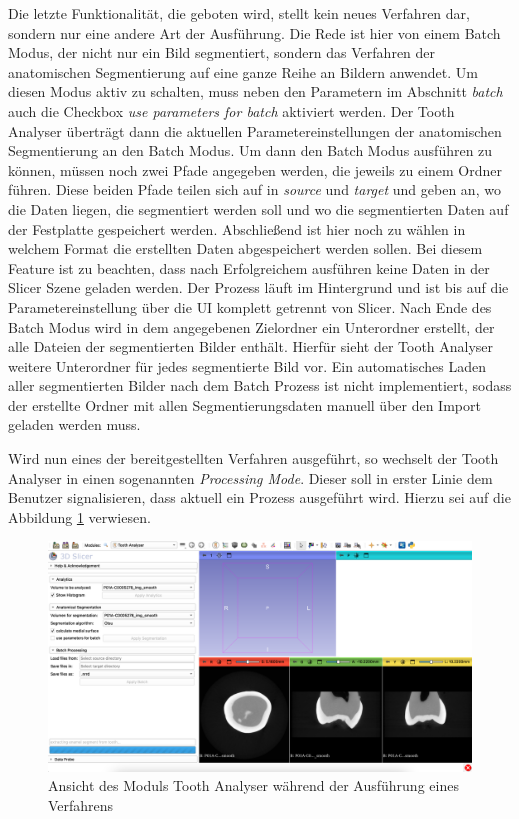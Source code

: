 Die letzte Funktionalität, die geboten wird, stellt kein neues Verfahren dar,
sondern nur eine andere Art der Ausführung. Die Rede ist hier von einem Batch Modus,
der nicht nur ein Bild segmentiert, sondern das Verfahren der anatomischen Segmentierung
auf eine ganze Reihe an Bildern anwendet. Um diesen Modus aktiv zu schalten, muss
neben den Parametern im Abschnitt \textit{batch} auch die Checkbox \textit{use
parameters for batch} aktiviert werden. Der Tooth Analyser überträgt dann die
aktuellen Parametereinstellungen der anatomischen Segmentierung an den Batch
Modus. Um dann den Batch Modus ausführen zu können, müssen noch zwei Pfade
angegeben werden, die jeweils zu einem Ordner führen. Diese beiden Pfade teilen
sich auf in \textit{source} und \textit{target} und geben an, wo die Daten liegen,
die segmentiert werden soll und wo die segmentierten Daten auf der Festplatte
gespeichert werden. Abschließend ist hier noch zu wählen in welchem Format die erstellten
Daten abgespeichert werden sollen. Bei diesem Feature ist zu beachten, dass nach
Erfolgreichem ausführen keine Daten in der Slicer Szene geladen werden. Der
Prozess läuft im Hintergrund und ist bis auf die Parametereinstellung über die
\ac{UI} komplett getrennt von Slicer. Nach Ende des Batch Modus wird in dem
angegebenen Zielordner ein Unterordner erstellt, der alle Dateien der segmentierten
Bilder enthält. Hierfür sieht der Tooth Analyser weitere Unterordner für jedes
segmentierte Bild vor. Ein automatisches Laden aller segmentierten Bilder nach dem
Batch Prozess ist nicht implementiert, sodass der erstellte Ordner mit allen
Segmentierungsdaten manuell über den Import geladen werden muss.

Wird nun eines der bereitgestellten Verfahren ausgeführt, so wechselt der Tooth Analyser
in einen sogenannten \textit{Processing Mode}. Dieser soll in erster Linie dem Benutzer
signalisieren, dass aktuell ein Prozess ausgeführt wird. Hierzu sei auf die Abbildung
\ref{fig:processing_mode} verwiesen.

\begin{figure}[h]
	\centering
	\includegraphics[scale=1, width=\textwidth]{img/processingMode.png}
	\caption{Ansicht des Moduls Tooth Analyser während der Ausführung eines
	Verfahrens}
	\label{fig:processing_mode}
\end{figure}

